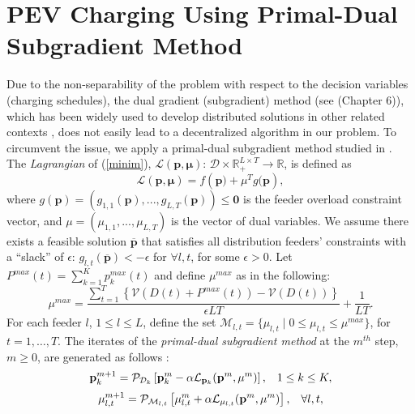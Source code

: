 \documentclass[12pt,draftcls,onecolumn]{IEEEtran}
\begin{document}
\section{PEV Charging Using Primal-Dual Subgradient Method}\label{sec:primal-dual}
Due to the non-separability of the problem with respect to the decision variables (charging schedules), the dual gradient (subgradient) method (see \cite{B99} (Chapter 6)), which has been widely used to develop distributed solutions in other related contexts \cite{KMT98, LL99}, does not easily lead to a decentralized algorithm in our problem. To circumvent the issue, we apply a primal-dual subgradient method studied in \cite{NO09,Z92}.\\
The \emph{Lagrangian} of (\ref{minim}), $\mathcal{L}(\mathbf{p}, \mathbf{\mu})\text{: } \mathcal{D} \times \mathbb{R}_{+}^{L\times T} \rightarrow \mathbb{R}$, is defined as
\begin{equation}
\mathcal{L}(\mathbf{p}, \mathbf{\mu})=f\left(\mathbf{p})+\mu^{T}g(\mathbf{p}\right),
\label{Dual}
\end{equation}
where $g(\mathbf{p})=(g_{1,1}(\mathbf{p}), ..., g_{L, T}(\mathbf{p})) \leq \mathbf{0}$ is the feeder overload constraint vector, and $\mu = (\mu_{1,1}, ..., \mu_{L,T})$ is the vector of dual variables. We assume there exists a feasible solution  $\overline{\mathbf{p}}$ that satisfies all distribution feeders\rq{} constraints with a ``slack'' of $\epsilon$: $g_{l, t}(\overline{\mathbf{p}})<-\epsilon$ for $\forall l, t$, for some $\epsilon > 0$. Let $P^{max}(t)=\sum_{k=1}^{K}p_k^{max}(t)$ and define $\mu^{max}$ as in the following:
\begin{equation}
\mu^{max}=\frac{\sum_{t=1}^{T}\left\{\mathcal{V}\left(D(t)+P^{max}(t)\right)-\mathcal{V}\left(D(t)\right)\right\}}{\epsilon LT}+\frac{1}{LT}.
\label{mumax}
\end{equation}
For each feeder $l$, $1 \leq l \leq L$, define the set $\mathcal{M}_{l,t} = \{\mu_{l,t} \mid 0 \leq \mu_{l,t} \leq \mu^{max}\}$, for $t=1, \ldots, T$. The iterates of the \emph{primal-dual subgradient method} at the $m^{th}$ step, $m \geq 0$, are generated as follows \cite{NO09,Z92}:
\begin{equation}
\mathbf{p}_k^{m+1}=\mathcal{P}_{\mathcal{D}_k}\left[\mathbf{p}_k^m - \alpha \mathcal{L}_{\mathbf{p}_k}(\mathbf{p}^m,\mathbf{\mu}^m)\right], \hspace{3mm} 1 \leq k \leq K,
\label{ProjectDk}
\end{equation}
\begin{equation}
\mathbf{\mu}_{l,t}^{m+1}=\mathcal{P}_{\mathcal{M}_{l,t}}\left[\mathbf{\mu}_{l,t}^{m}+\alpha \mathcal{L}_{\mu_{l,t}}(\mathbf{p}^m, \mathbf{\mu}^m)\right], \hspace{3mm} \forall l, t,
\label{Projectpm}
\end{equation}
\end{document}
